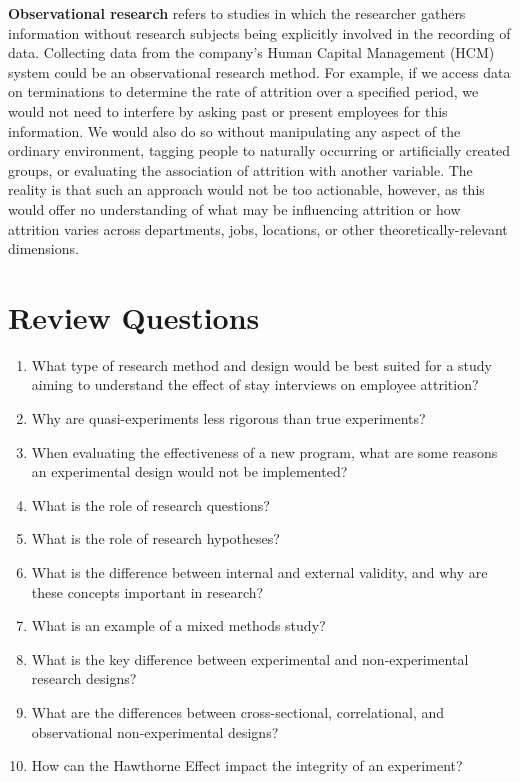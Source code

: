 \documentclass[
]{book}
\begin{document}
\textbf{Observational research} refers to studies in which the researcher gathers information without research subjects being explicitly involved in the recording of data. Collecting data from the company's Human Capital Management (HCM) system could be an observational research method. For example, if we access data on terminations to determine the rate of attrition over a specified period, we would not need to interfere by asking past or present employees for this information. We would also do so without manipulating any aspect of the ordinary environment, tagging people to naturally occurring or artificially created groups, or evaluating the association of attrition with another variable. The reality is that such an approach would not be too actionable, however, as this would offer no understanding of what may be influencing attrition or how attrition varies across departments, jobs, locations, or other theoretically-relevant dimensions.

\hypertarget{review-questions-2}{%
\section{Review Questions}\label{review-questions-2}}

\begin{enumerate}
\def\labelenumi{\arabic{enumi}.}
\item
  What type of research method and design would be best suited for a study aiming to understand the effect of stay interviews on employee attrition?
\item
  Why are quasi-experiments less rigorous than true experiments?
\item
  When evaluating the effectiveness of a new program, what are some reasons an experimental design would not be implemented?
\item
  What is the role of research questions?
\item
  What is the role of research hypotheses?
\item
  What is the difference between internal and external validity, and why are these concepts important in research?
\item
  What is an example of a mixed methods study?
\item
  What is the key difference between experimental and non-experimental research designs?
\item
  What are the differences between cross-sectional, correlational, and observational non-experimental designs?
\item
  How can the Hawthorne Effect impact the integrity of an experiment?
\end{enumerate}
\end{document}
